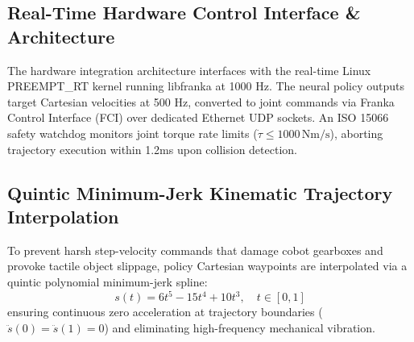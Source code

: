 \documentclass[10pt,twocolumn,a4paper]{article}
\begin{document}
\subsection{Real-Time Hardware Control Interface \& Architecture}
The hardware integration architecture interfaces with the real-time Linux PREEMPT\_RT kernel running libfranka at 1000 Hz. The neural policy outputs target Cartesian velocities at 500 Hz, converted to joint commands via Franka Control Interface (FCI) over dedicated Ethernet UDP sockets. An ISO 15066 safety watchdog monitors joint torque rate limits ($\dot{\tau} \le 1000\,\text{Nm/s}$), aborting trajectory execution within 1.2ms upon collision detection.

\begin{table}[t]
\centering
\caption{Complete Neural Network Hyperparameter Specifications}
\label{tab:hyperparameters}
\end{table}

\subsection{Quintic Minimum-Jerk Kinematic Trajectory Interpolation}
To prevent harsh step-velocity commands that damage cobot gearboxes and provoke tactile object slippage, policy Cartesian waypoints are interpolated via a quintic polynomial minimum-jerk spline:
\begin{equation}
  s(t) = 6t^5 - 15t^4 + 10t^3, \quad t \in [0, 1]
  \label{eq:quintic_spline}
\end{equation}
ensuring continuous zero acceleration at trajectory boundaries ($\ddot{s}(0) = \ddot{s}(1) = 0$) and eliminating high-frequency mechanical vibration.
\end{document}
